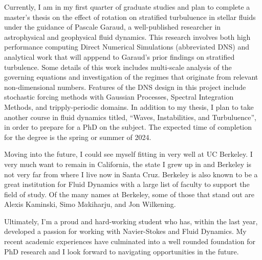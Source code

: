 \documentclass{article}
\begin{document}
Currently, I am in my first quarter of graduate studies and plan to complete a master's thesis on the effect of rotation on stratified turbuluence in stellar fluids under the guidance of Pascale Garaud, a well-published researcher in astrophysical and geophysical fluid dynamics. This research involves both high performance computing Direct Numerical Simulations (abbreviated DNS) and analytical work that will apppend to Garaud's prior findings on stratified turbulence. Some details of this work includes multi-scale analysis of the governing equations and investigation of the regimes that originate from relevant non-dimensional numbers. Features of the DNS design in this project include stochastic forcing methods with Gaussian Processes, Spectral Integration Methods, and tripply-periodic domains. In addition to my thesis, I plan to take another course in fluid dynamics titled, ``Waves, Instabilities, and Turbuluence'', in order to prepare for a PhD on the subject. The expected time of completion for the degree is the spring or summer of 2024. 

Moving into the future, I could see myself fitting in very well at UC Berkeley. I very much want to remain in California, the state I grew up in and Berkeley is not very far from where I live now in Santa Cruz. Berkeley is also known to be a great institution for Fluid Dynamics with a large list of faculty to support the field of study. Of the many names at Berkeley, some of those that stand out are Alexis Kaminski, Simo M$\ddot{a}$kiharju, and Jon Wilkening. 

Ultimately, I'm a proud and hard-working student who has, within the last year, developed a passion for working with Navier-Stokes and Fluid Dynamics. My recent academic experiences have culminated into a well rounded foundation for PhD research and I look forward to navigating opportunities in the future. 
\end{document}
